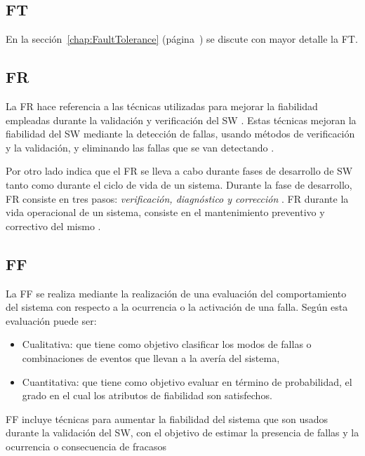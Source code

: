 
\subsection{\acl{FT}}
En la sección~\ref{chap:FaultTolerance} (página~\pageref{chap:FaultTolerance}) se discute con
mayor detalle la \ac{FT}.

\subsection{\acl{FR}}
La \ac{FR} hace referencia a las técnicas utilizadas para mejorar la fiabilidad empleadas durante
la validación y verificación del \ac{SW} \citep{Pullum01}. Estas técnicas mejoran la fiabilidad del
\ac{SW} mediante la detección de fallas, usando métodos de verificación y la validación, y
eliminando las fallas que se van detectando \citep{Pullum01}.

Por otro lado \cite{FTDesign} indica que el \ac{FR} se lleva a cabo durante fases de desarrollo de
\ac{SW} tanto como durante el ciclo de vida de un sistema. Durante la fase de desarrollo, \ac{FR}
consiste en tres pasos: \textit{verificación, diagnóstico y corrección} \citep{FTDesign}. \ac{FR}
durante la vida operacional de un sistema, consiste en el mantenimiento preventivo y correctivo del
mismo \citep{FTDesign}.

\subsection{\acl{FF}}
La \ac{FF} se realiza mediante la realización de una evaluación del comportamiento del sistema con
respecto a la ocurrencia o la activación de una falla. Según \cite{FTDesign} esta evaluación puede ser:
\begin{itemize}
 \item Cualitativa: que tiene como objetivo clasificar los modos de fallas o combinaciones de
eventos que llevan a la avería del sistema,
 \item Cuantitativa: que tiene como objetivo evaluar en término de probabilidad, el grado en el
cual los atributos de fiabilidad son satisfechos.
\end{itemize}

\ac{FF} incluye técnicas para aumentar la fiabilidad del sistema que son usados durante la
validación del \ac{SW}, con el objetivo de estimar la presencia de fallas y la ocurrencia o
consecuencia de fracasos \citep{Pullum01}

